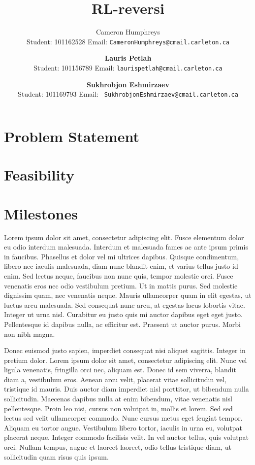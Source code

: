 \documentclass{article}
\title{RL-reversi}
\author{
  Cameron Humphreys\\Student: 101162528
  Email: \texttt{CameronHumphreys@cmail.carleton.ca}
  \and
  \textbf{Lauris Petlah}\\Student: 101156789
  Email: \texttt{laurispetlah@cmail.carleton.ca}
  \and
  \textbf{Sukhrobjon Eshmirzaev}\\Student: 101169793
  Email: \texttt{ SukhrobjonEshmirzaev@cmail.carleton.ca}
}
\begin{document}
\maketitle



\section{Problem Statement}
\label{problem_statement}

\section{Feasibility}
\label{feasibility}



\section{Milestones}
Lorem ipsum dolor sit amet, consectetur adipiscing elit. Fusce elementum dolor eu odio interdum malesuada. Interdum et malesuada fames ac ante ipsum primis in faucibus. Phasellus et dolor vel mi ultrices dapibus. Quisque condimentum, libero nec iaculis malesuada, diam nunc blandit enim, et varius tellus justo id enim. Sed lectus neque, faucibus non nunc quis, tempor molestie orci. Fusce venenatis eros nec odio vestibulum pretium. Ut in mattis purus. Sed molestie dignissim quam, nec venenatis neque. Mauris ullamcorper quam in elit egestas, ut luctus arcu malesuada. Sed consequat nunc arcu, at egestas lacus lobortis vitae. Integer ut urna nisl. Curabitur eu justo quis mi auctor dapibus eget eget justo. Pellentesque id dapibus nulla, ac efficitur est. Praesent ut auctor purus. Morbi non nibh magna.

Donec euismod justo sapien, imperdiet consequat nisi aliquet sagittis. Integer in pretium dolor. Lorem ipsum dolor sit amet, consectetur adipiscing elit. Nunc vel ligula venenatis, fringilla orci nec, aliquam est. Donec id sem viverra, blandit diam a, vestibulum eros. Aenean arcu velit, placerat vitae sollicitudin vel, tristique id mauris. Duis auctor diam imperdiet nisl porttitor, ut bibendum nulla sollicitudin. Maecenas dapibus nulla at enim bibendum, vitae venenatis nisl pellentesque. Proin leo nisi, cursus non volutpat in, mollis et lorem. Sed sed lectus sed velit ullamcorper commodo. Nunc cursus metus eget feugiat tempor. Aliquam eu tortor augue. Vestibulum libero tortor, iaculis in urna eu, volutpat placerat neque. Integer commodo facilisis velit. In vel auctor tellus, quis volutpat orci. Nullam tempus, augue et laoreet laoreet, odio tellus tristique diam, ut sollicitudin quam risus quis ipsum.
\end{document}
